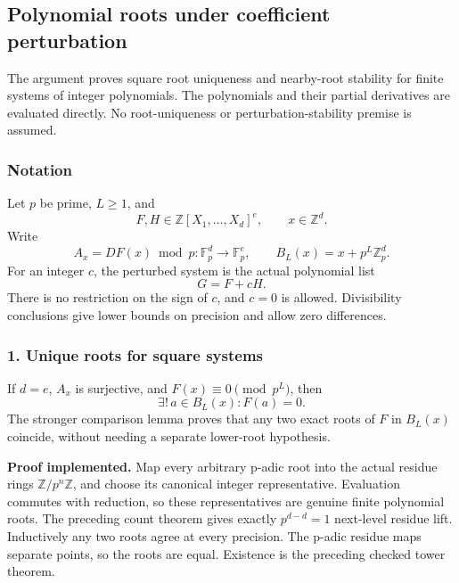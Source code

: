 \hypertarget{cont4:polynomial-roots-under-coefficient-perturbation}{%
\subsection{Polynomial roots under coefficient
perturbation}\label{cont4:polynomial-roots-under-coefficient-perturbation}}

The argument proves square root uniqueness and nearby-root stability
for finite systems of integer polynomials. The polynomials and their
partial derivatives are evaluated directly. No root-uniqueness or
perturbation-stability premise is assumed.

\hypertarget{cont4:notation}{%
\subsubsection{Notation}\label{cont4:notation}}

Let \(p\) be prime, \(L\ge1\), and \[
F,H\in\mathbb Z[X_1,\ldots,X_d]^e,
\qquad x\in\mathbb Z^d.
\] Write \[
A_x=DF(x)\bmod p:\mathbb F_p^d\longrightarrow\mathbb F_p^e,
\qquad B_L(x)=x+p^L\mathbb Z_p^d.
\] For an integer \(c\), the perturbed system is the actual polynomial
list \[
G=F+cH.
\] There is no restriction on the sign of \(c\), and \(c=0\) is allowed.
Divisibility conclusions give lower bounds on precision and allow zero
differences.

\hypertarget{cont4:unique-roots-for-square-systems}{%
\subsubsection{1. Unique roots for square
systems}\label{cont4:unique-roots-for-square-systems}}

If \(d=e\), \(A_x\) is surjective, and \(F(x)\equiv0\pmod{p^L}\), then
\[
\boxed{\exists!\,a\in B_L(x):F(a)=0.}
\] The stronger comparison lemma proves that any two exact roots of
\(F\) in \(B_L(x)\) coincide, without needing a separate lower-root
hypothesis.

\textbf{Proof implemented.} Map every arbitrary p-adic root into the
actual residue rings \(\mathbb Z/p^n\mathbb Z\), and choose its
canonical integer representative. Evaluation commutes with reduction, so
these representatives are genuine finite polynomial roots. The preceding
count theorem gives exactly \(p^{d-d}=1\) next-level residue lift.
Inductively any two roots agree at every precision. The p-adic residue
maps separate points, so the roots are equal. Existence is the preceding
checked tower theorem.

